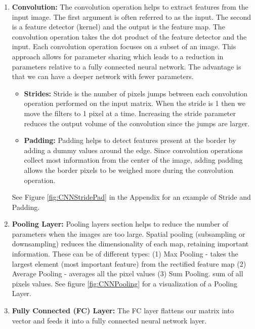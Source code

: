 \documentclass[11pt]{article}
\begin{document}
\begin{enumerate}
\item \textbf{Convolution:} The convolution operation helps to extract features
  from the input image. The first argument is often referred
  to as the input. The second is a feature detector (kernel) and
  the output is the feature map. The convolution operation takes the dot
  product of the feature detector and the input. Each convolution operation
  focuses on a subset of an image. This approach allows for parameter
  sharing which leads to a reduction in parameters relative to a
  fully connected neural network. The advantage 
  is that we can have a deeper network with fewer parameters.

  \begin{itemize}
  \item \textbf{Strides:} Stride is the number of pixels jumps between
    each convolution operation performed on the input matrix. When the stride
    is 1 then we move the filters to 1 pixel at a time. Increasing the stride
    parameter reduces the output volume of the convolution since the jumps
    are larger.
  \item \textbf{Padding:} Padding helps to detect features present at the
    border by adding a dummy values around the edge. Since convolution
    operations collect most information from the center of the image, adding
    padding allows the border pixels to be weighed more during the convolution
    operation.
  \end{itemize}

  See Figure \ref{fig:CNNStridePad} in the Appendix for an example of Stride
  and Padding.

\item \textbf{Pooling Layer:} Pooling layers section helps to reduce the
  number of parameters when the images are too large. Spatial pooling
  (subsampling or downsampling) reduces the dimensionality of each map,
  retaining important information. These can be of different types:
  (1) Max Pooling - takes the largest element (most important feature)
  from the rectified feature map (2) Average Pooling - averages all the
  pixel values (3) Sum Pooling. sum of all pixels values. See figure
  \ref{fig:CNNPooling} for a visualization of a Pooling Layer.

\item \textbf{Fully Connected (FC) Layer:} The FC layer flattens our
  matrix into vector and feeds it into a fully connected neural network layer.
  \end{enumerate}
\end{document}
